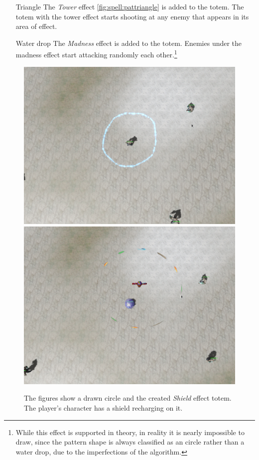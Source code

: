 \begin{description}
\begin{itemize}
		\item[Triangle] The \emph{Tower} effect \ref{fig:spell:pattriangle} is added to the totem. The totem with the tower effect starts shooting at any enemy that appears in its area of effect.
		\item[Water drop] The \emph{Madness} effect is added to the totem. Enemies under the madness effect start attacking randomly each other.\footnote {While this effect is supported in theory, in reality it is nearly impossible to draw, since the pattern shape is always classified as an circle rather than a water drop, due to the imperfections of the algorithm.}
	\end{itemize}
\end{description}

\begin{figure}[p]
\centering
\includegraphics[width=.47\linewidth]{ext/scr/circle.png}
\quad
\includegraphics[width=.47\linewidth]{ext/scr/circlee.png}
\caption{The figures show a drawn circle and the created \emph{Shield} effect totem. The player's character has a shield recharging on it. }
\label{fig:spell:circle}
\end{figure}

